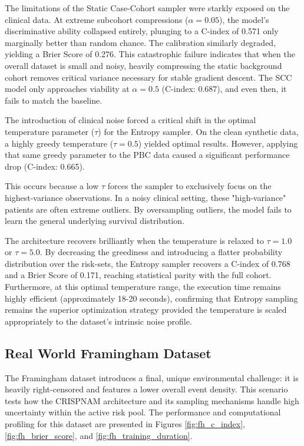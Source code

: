 \documentclass[a4paper,twoside,12pt]{report}
\begin{document}
The limitations of the Static Case-Cohort sampler were starkly exposed on the clinical data. At extreme subcohort compressions ($\alpha=0.05$), the model's discriminative ability collapsed entirely, plunging to a C-index of 0.571 only marginally better than random chance. The calibration similarly degraded, yielding a Brier Score of 0.276. This catastrophic failure indicates that when the overall dataset is small and noisy, heavily compressing the static background cohort removes critical variance necessary for stable gradient descent. The SCC model only approaches viability at $\alpha=0.5$ (C-index: 0.687), and even then, it fails to match the baseline.


The introduction of clinical noise forced a critical shift in the optimal temperature parameter ($\tau$) for the Entropy sampler. On the clean synthetic data, a highly greedy temperature ($\tau=0.5$) yielded optimal results. However, applying that same greedy parameter to the PBC data caused a significant performance drop (C-index: 0.665). 

This occurs because a low $\tau$ forces the sampler to exclusively focus on the highest-variance observations. In a noisy clinical setting, these "high-variance" patients are often extreme outliers. By oversampling outliers, the model fails to learn the general underlying survival distribution. 

The architecture recovers brilliantly when the temperature is relaxed to $\tau=1.0$ or $\tau=5.0$. By decreasing the greediness and introducing a flatter probability distribution over the risk-sets, the Entropy sampler recovers a C-index of 0.768 and a Brier Score of 0.171, reaching statistical parity with the full cohort. Furthermore, at this optimal temperature range, the execution time remains highly efficient (approximately 18-20 seconds), confirming that Entropy sampling remains the superior optimization strategy provided the temperature is scaled appropriately to the dataset's intrinsic noise profile.

\subsection{Real World Framingham Dataset}

The Framingham dataset introduces a final, unique environmental challenge: it is heavily right-censored and features a lower overall event density. This scenario tests how the CRISPNAM architecture and its sampling mechanisms handle high uncertainty within the active risk pool. The performance and computational profiling for this dataset are presented in Figures \ref{fig:fh_c_index}, \ref{fig:fh_brier_score}, and \ref{fig:fh_training_duration}.
\end{document}
